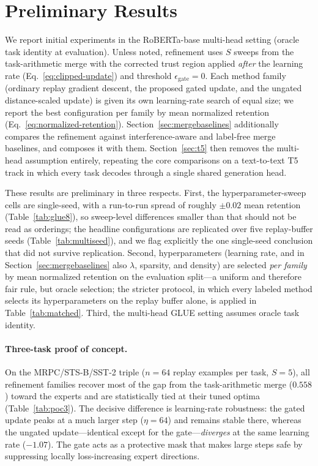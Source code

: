 \documentclass[11pt]{article}
\begin{document}
\section{Preliminary Results}
\label{sec:results}
We report initial experiments in the RoBERTa-base multi-head setting (oracle task identity at evaluation). Unless noted, refinement uses $S$ sweeps from the task-arithmetic merge with the corrected trust region applied \emph{after} the learning rate (Eq.~\eqref{eq:clipped-update}) and threshold $\epsilon_{\mathrm{gate}}=0$. Each method family (ordinary replay gradient descent, the proposed gated update, and the ungated distance-scaled update) is given its own learning-rate search of equal size; we report the best configuration per family by mean normalized retention (Eq.~\eqref{eq:normalized-retention}). Section~\ref{sec:mergebaselines} additionally compares the refinement against interference-aware and label-free merge baselines, and composes it with them. Section~\ref{sec:t5} then removes the multi-head assumption entirely, repeating the core comparisons on a text-to-text T5 track in which every task decodes through a single shared generation head.

These results are preliminary in three respects. First, the hyperparameter-sweep cells are single-seed, with a run-to-run spread of roughly $\pm0.02$ mean retention (Table~\ref{tab:glue8}), so sweep-level differences smaller than that should not be read as orderings; the headline configurations are replicated over five replay-buffer seeds (Table~\ref{tab:multiseed}), and we flag explicitly the one single-seed conclusion that did not survive replication. Second, hyperparameters (learning rate, and in Section~\ref{sec:mergebaselines} also $\lambda$, sparsity, and density) are selected \emph{per family} by mean normalized retention on the evaluation split---a uniform and therefore fair rule, but oracle selection; the stricter protocol, in which every labeled method selects its hyperparameters on the replay buffer alone, is applied in Table~\ref{tab:matched}. Third, the multi-head GLUE setting assumes oracle task identity.



\paragraph{Three-task proof of concept.}
On the MRPC/STS-B/SST-2 triple ($n=64$ replay examples per task, $S=5$), all refinement families recover most of the gap from the task-arithmetic merge ($0.558$) toward the experts and are statistically tied at their tuned optima (Table~\ref{tab:poc3}). The decisive difference is learning-rate robustness: the gated update peaks at a much larger step ($\eta=64$) and remains stable there, whereas the ungated update---identical except for the gate---\emph{diverges} at the same learning rate ($-1.07$). The gate acts as a protective mask that makes large steps safe by suppressing locally loss-increasing expert directions.
\end{document}
